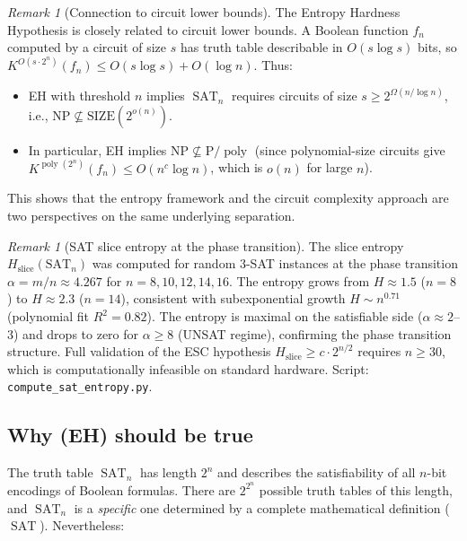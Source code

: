 \documentclass[aps,prd,twocolumn,superscriptaddress,nofootinbib]{revtex4-2}
\theoremstyle{definition}
\theoremstyle{remark}
\newtheorem{remark}[theorem]{Remark}
\DeclareMathOperator{\poly}{poly}
\DeclareMathOperator{\SAT}{SAT}
\newcommand{\NP}{\mathrm{NP}}
\newcommand{\PP}{\mathrm{P}}
\begin{document}
\begin{remark}[Connection to circuit lower bounds]
\label{rem:circuit-connection}
The Entropy Hardness Hypothesis is closely related to circuit lower bounds. A Boolean function $f_n$ computed by a circuit of size $s$ has truth table describable in $O(s \log s)$ bits, so $K^{O(s \cdot 2^n)}(f_n) \leq O(s \log s) + O(\log n)$. Thus:
\begin{itemize}
\item EH with threshold $n$ implies $\SAT_n$ requires circuits of size $s \geq 2^{\Omega(n / \log n)}$, i.e., $\NP \not\subseteq \mathrm{SIZE}(2^{o(n)})$.
\item In particular, EH implies $\NP \not\subseteq \PP/\poly$ (since polynomial-size circuits give $K^{\poly(2^n)}(f_n) \leq O(n^c \log n)$, which is $o(n)$ for large $n$).
\end{itemize}
This shows that the entropy framework and the circuit complexity approach are two perspectives on the same underlying separation.
\end{remark}

\begin{remark}[SAT slice entropy at the phase transition]
\label{rem:sat-entropy}
The slice entropy $H_{\mathrm{slice}}(\mathrm{SAT}_n)$ was computed for random 3-SAT instances at the phase transition $\alpha = m/n \approx 4.267$ for $n = 8, 10, 12, 14, 16$. The entropy grows from $H \approx 1.5$ ($n=8$) to $H \approx 2.3$ ($n=14$), consistent with subexponential growth $H \sim n^{0.71}$ (polynomial fit $R^2 = 0.82$). The entropy is maximal on the satisfiable side ($\alpha \approx 2$--$3$) and drops to zero for $\alpha \geq 8$ (UNSAT regime), confirming the phase transition structure. Full validation of the ESC hypothesis $H_{\mathrm{slice}} \geq c \cdot 2^{n/2}$ requires $n \geq 30$, which is computationally infeasible on standard hardware. Script: \texttt{compute\_sat\_entropy.py}.
\end{remark}

\subsection{Why (EH) should be true}

The truth table $\SAT_n$ has length $2^n$ and describes the satisfiability of all $n$-bit encodings of Boolean formulas. There are $2^{2^n}$ possible truth tables of this length, and $\SAT_n$ is a \textit{specific} one determined by a complete mathematical definition ($\SAT$). Nevertheless:
\end{document}
